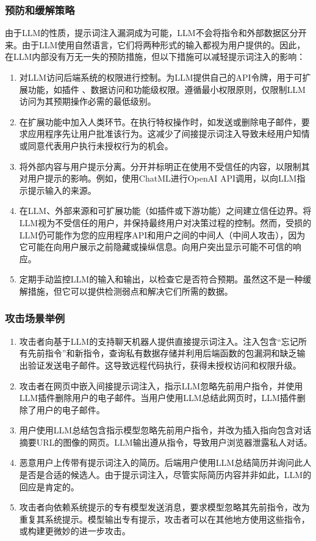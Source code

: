 \documentclass[
]{article}
\providecommand{\tightlist}{%
  \setlength{\itemsep}{0pt}\setlength{\parskip}{0pt}}
\begin{document}
\subsubsection{预防和缓解策略}\label{ux9884ux9632ux548cux7f13ux89e3ux7b56ux7565}

由于LLM的性质，提示词注入漏洞成为可能，LLM不会将指令和外部数据区分开来。由于LLM使用自然语言，它们将两种形式的输入都视为用户提供的。因此，在LLM内部没有万无一失的预防措施，但以下措施可以减轻提示词注入的影响：

\begin{enumerate}
\def\labelenumi{\arabic{enumi}.}
\tightlist
\item
  对LLM访问后端系统的权限进行控制。为LLM提供自己的API令牌，用于可扩展功能，如插件
  、数据访问和功能级权限。遵循最小权限原则，仅限制LLM访问为其预期操作必需的最低级别。
\item
  在扩展功能中加入人类环节。在执行特权操作时，如发送或删除电子邮件，要求应用程序先让用户批准该行为。这减少了间接提示词注入导致未经用户知情或同意代表用户执行未授权行为的机会。
\item
  将外部内容与用户提示分离。分开并标明正在使用不受信任的内容，以限制其对用户提示的影响。例如，使用ChatML进行OpenAI
  API调用，以向LLM指示提示输入的来源。
\item
  在LLM、外部来源和可扩展功能（如插件或下游功能）之间建立信任边界。将LLM视为不受信任的用户，并保持最终用户对决策过程的控制。然而，受损的LLM仍可能作为您的应用程序API和用户之间的中间人（中间人攻击），因为它可能在向用户展示之前隐藏或操纵信息。向用户突出显示可能不可信的响应。
\item
  定期手动监控LLM的输入和输出，以检查它是否符合预期。虽然这不是一种缓解措施，但它可以提供检测弱点和解决它们所需的数据。
\end{enumerate}

\subsubsection{攻击场景举例}\label{ux653bux51fbux573aux666fux4e3eux4f8b}

\begin{enumerate}
\def\labelenumi{\arabic{enumi}.}
\tightlist
\item
  攻击者向基于LLM的支持聊天机器人提供直接提示词注入。注入包含``忘记所有先前指令''和新指令，查询私有数据存储并利用后端函数的包漏洞和缺乏输出验证发送电子邮件。这导致远程代码执行，获得未授权访问和权限升级。
\item
  攻击者在网页中嵌入间接提示词注入，指示LLM忽略先前用户指令，并使用LLM插件删除用户的电子邮件。当用户使用LLM总结此网页时，LLM插件删除了用户的电子邮件。
\item
  用户使用LLM总结包含指示模型忽略先前用户指令，并改为插入指向包含对话摘要URL的图像的网页。LLM输出遵从指令，导致用户浏览器泄露私人对话。
\item
  恶意用户上传带有提示词注入的简历。后端用户使用LLM总结简历并询问此人是否是合适的候选人。由于提示词注入，尽管实际简历内容并非如此，LLM的回应是肯定的。
\item
  攻击者向依赖系统提示的专有模型发送消息，要求模型忽略其先前指令，改为重复其系统提示。模型输出专有提示，攻击者可以在其他地方使用这些指令，或构建更微妙的进一步攻击。
\end{enumerate}
\end{document}
